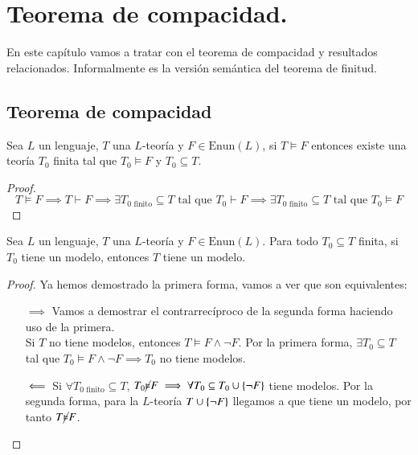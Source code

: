 
\chapter{Teorema de compacidad.}

En este capítulo vamos a tratar con el teorema de compacidad y resultados relacionados. Informalmente es la versión semántica del teorema de finitud.

\section{Teorema de compacidad}

\begin{thm}\label{thm:compacidad1}
    Sea $L$ un lenguaje, $T$ una $L$-teoría y $F \in \mathrm{Enun}(L)$, si $T \vDash F$ entonces existe una teoría $T_0$ finita tal que $T_0 \vDash F$ y $T_0 \subseteq T$.
\end{thm}

\begin{proof}
    $$
        T \vDash F \implies T \vdash F \implies \exists T_\text{$0$ finito} \subseteq T \text{ tal que } T_0 \vdash F \implies \exists T_\text{$0$ finito} \subseteq T \text{ tal que } T_0 \vDash F
    $$
\end{proof}

\begin{thm}\label{thm:compacidad2}
    Sea $L$ un lenguaje, $T$ una $L$-teoría y $F \in \mathrm{Enun}(L)$. Para todo $T_0 \subseteq T$ finita, si $T_0$ tiene un modelo, entonces $T$ tiene un modelo.
\end{thm}

\begin{proof}
    Ya hemos demostrado la primera forma, vamos a ver que son equivalentes:
    \begin{itemize}
        \item[$\implies$] Vamos a demostrar el contrarrecíproco de la segunda forma haciendo uso de la primera.\\
        Si $T$ no tiene modelos, entonces $T \vDash F \land \neg F$. Por la primera forma, $\exists T_0 \subseteq T$ tal que $T_0 \vDash F \land \neg F \implies T_0$ no tiene modelos.
        \item[$\ \Longleftarrow\ $] Si $\forall T_\text{$0$ finito} \subseteq T$, $T_0 \cancel\vDash F \implies \forall T_0 \subseteq T_0 \cup \left\{\neg F\right\}$ tiene modelos. Por la segunda forma, para la $L$-teoría $T \cup \left\{\neg F\right\}$ llegamos a que tiene un modelo, por tanto $T \cancel\vDash F$.
    \end{itemize}
\end{proof}

